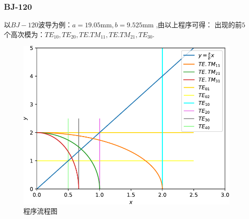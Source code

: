     \subsubsection{BJ-120}
    以$BJ-120$波导为例：$a=19.05\mathrm{mm},b=9.525\mathrm{mm}$  ,由以上程序可得：
    出现的前$5$个高次模为：$TE_{10},TE_{20},TE.TM_{11},TE.TM_{21},TE_{30}$.
\begin{figure}[htbp]
    \centering
    \includegraphics[width=0.7\linewidth]{figure/Microwave-BJ120-crop.pdf}
    \caption{程序流程图}
    \label{pic1-3}
\end{figure}